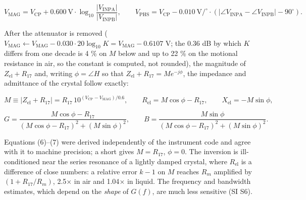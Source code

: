 \documentclass[11pt,a4paper]{article}
\begin{document}
\begin{equation}\tag{5}
V_\mathrm{MAG} = V_\mathrm{CP} + 0.600\ \mathrm{V}\cdot\log_{10}\frac{|V_\mathrm{INPA}|}{|V_\mathrm{INPB}|},\qquad V_\mathrm{PHS} = V_\mathrm{CP} - 0.010\ \mathrm{V}/^\circ\cdot\left(|\angle V_\mathrm{INPA} - \angle V_\mathrm{INPB}| - 90^\circ\right).
\end{equation}

After the attenuator is removed ($V_\mathrm{MAG} \leftarrow V_\mathrm{MAG} - 0.030\cdot20\log_{10}K = V_\mathrm{MAG} - 0.6107$ V; the 0.36 dB by which $K$ differs from one decade is 4 \% on $M$ below and up to 22 \% on the motional resistance in air, so the constant is computed, not rounded), the magnitude of $Z_\mathrm{el} + R_{17}$ and, writing $\phi = \angle H$ so that $Z_\mathrm{el} + R_{17} = Me^{-j\phi}$, the impedance and admittance of the crystal follow exactly:

\begin{equation}\tag{6}
M \equiv |Z_\mathrm{el} + R_{17}| = R_{17}\,10^{(V_\mathrm{CP} - V_\mathrm{MAG})/0.6},\qquad R_\mathrm{el} = M\cos\phi - R_{17},\qquad X_\mathrm{el} = -M\sin\phi,
\end{equation}

\begin{equation}\tag{7}
G = \frac{M\cos\phi - R_{17}}{(M\cos\phi - R_{17})^2 + (M\sin\phi)^2},\qquad B = \frac{M\sin\phi}{(M\cos\phi - R_{17})^2 + (M\sin\phi)^2}.
\end{equation}

Equations (6)--(7) were derived independently of the instrument code and agree with it to machine precision; a short gives $M = R_{17}$, $\phi = 0$. The inversion is ill-conditioned near the series resonance of a lightly damped crystal, where $R_\mathrm{el}$ is a difference of close numbers: a relative error $k - 1$ on $M$ reaches $R_m$ amplified by $(1 + R_{17}/R_m)$, 2.5$\times$ in air and 1.04$\times$ in liquid. The frequency and bandwidth estimates, which depend on the \emph{shape} of $G(f)$, are much less sensitive (SI S6).
\end{document}
